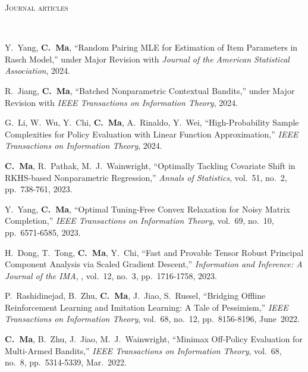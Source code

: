 \documentclass[a4paper, 10pt]{article}
\newenvironment{changemargin}[2]{%
  \begin{list}{}{%
    \setlength{\topsep}{0pt}%
    \setlength{\leftmargin}{#1}%
    \setlength{\rightmargin}{#2}%
    \setlength{\listparindent}{\parindent}%
    \setlength{\itemindent}{\parindent}%
    \setlength{\parsep}{\parskip}%
  }%
  \item[]}{\end{list}
}
\newcommand{\lineover}{
	\begin{changemargin}{-0.05in}{-0.05in}
		\vspace*{-8pt}
		\hrulefill \\
		\vspace*{-2pt}
	\end{changemargin}
}
\newcommand{\header}[1]{
	\begin{changemargin}{-0.5in}{-0.5in}
		\scshape{#1}\\
  	\lineover
	\end{changemargin}
}
\newenvironment{body} {
	\vspace*{-16pt}
	\begin{changemargin}{-0.3in}{-0.5in}
  }	
	{\end{changemargin}
}
\begin{document}
\bigskip
\header{\LARGE{Journal articles}}
\begin{body}
\vspace{18pt}
\begin{enumerate}[label={[{J}{{\arabic*}}]}]

\item Y.~Yang, \textbf{C.~Ma}, ``Random Pairing MLE for Estimation of Item Parameters in Rasch Model,'' under Major Revision with \emph{Journal of the American Statistical Association}, 2024.

\item R.~Jiang, \textbf{C.~Ma}, ``Batched Nonparametric Contextual Bandits,'' under Major Revision with \emph{IEEE Transactions on Information Theory}, 2024.


\item G.~Li, W.~Wu, Y.~Chi, \textbf{C.~Ma}, A.~Rinaldo, Y.~Wei, ``High-Probability Sample Complexities for Policy Evaluation with Linear Function Approximation,'' \emph{IEEE Transactions on Information Theory}, 2024.


\item \textbf{C.~Ma}, R.~Pathak, M.~J.~Wainwright, ``Optimally Tackling Covariate Shift in RKHS-based Nonparametric Regression,'' \emph{Annals of Statistics},  vol.~51, no.~2, pp.~738-761, 2023.

	
\item Y.~Yang, \textbf{C.~Ma}, {``Optimal Tuning-Free Convex Relaxation for Noisy Matrix Completion,''}  \emph{IEEE Transactions on Information Theory}, vol.~69, no.~10, pp.~6571-6585, 2023. \\

\item {H.~Dong, T.~Tong, \textbf{C.~Ma}, Y.~Chi, ``Fast and Provable Tensor Robust Principal Component Analysis via Scaled Gradient Descent,''} \emph{Information and Inference: A Journal of the IMA}, , vol.~12, no.~3, pp.~1716-1758, 2023.


\item P.~Rashidinejad, B.~Zhu, \textbf{C.~Ma}, J.~Jiao, S.~Russel, {``Bridging Offline Reinforcement Learning and Imitation Learning: A Tale of Pessimism,''} \emph{IEEE Transactions on Information Theory},  vol.~68, no.~12, pp.~8156-8196, June~2022.

\item \textbf{C.~Ma}, B.~Zhu, J.~Jiao, M.~J.~Wainwright, {``Minimax Off-Policy Evaluation for Multi-Armed Bandits,''} \emph{IEEE Transactions on Information Theory}, vol.~68, no.~8, pp.~5314-5339, Mar.~2022. \\



\end{enumerate}
\end{body}
\end{document}
